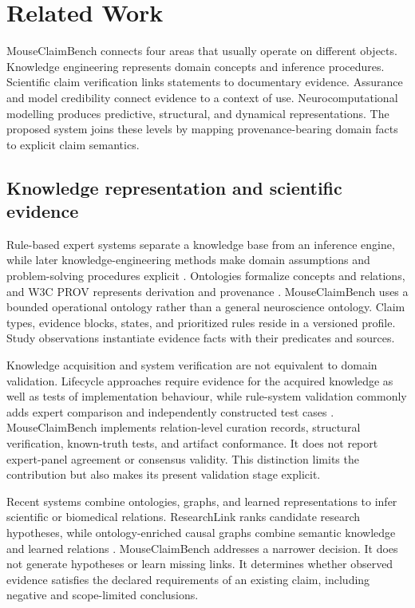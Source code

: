 \section{Related Work}
\label{sec:related-work}

MouseClaimBench connects four areas that usually operate on different objects. Knowledge engineering represents domain concepts and inference procedures. Scientific claim verification links statements to documentary evidence. Assurance and model credibility connect evidence to a context of use. Neurocomputational modelling produces predictive, structural, and dynamical representations. The proposed system joins these levels by mapping provenance-bearing domain facts to explicit claim semantics.

\subsection{Knowledge representation and scientific evidence}
\label{subsec:knowledge-engineering}

Rule-based expert systems separate a knowledge base from an inference engine, while later knowledge-engineering methods make domain assumptions and problem-solving procedures explicit \citep{buchanan1984rulebased,studer1998knowledge}. Ontologies formalize concepts and relations, and W3C PROV represents derivation and provenance \citep{guarino1998formal,lebo2013provo}. MouseClaimBench uses a bounded operational ontology rather than a general neuroscience ontology. Claim types, evidence blocks, states, and prioritized rules reside in a versioned profile. Study observations instantiate evidence facts with their predicates and sources.

Knowledge acquisition and system verification are not equivalent to domain validation. Lifecycle approaches require evidence for the acquired knowledge as well as tests of implementation behaviour, while rule-system validation commonly adds expert comparison and independently constructed test cases \citep{benbasat1989validation,knauf2002validation}. MouseClaimBench implements relation-level curation records, structural verification, known-truth tests, and artifact conformance. It does not report expert-panel agreement or consensus validity. This distinction limits the contribution but also makes its present validation stage explicit.

Recent systems combine ontologies, graphs, and learned representations to infer scientific or biomedical relations. ResearchLink ranks candidate research hypotheses, while ontology-enriched causal graphs combine semantic knowledge and learned relations \citep{borrego2025research,pham2026causal}. MouseClaimBench addresses a narrower decision. It does not generate hypotheses or learn missing links. It determines whether observed evidence satisfies the declared requirements of an existing claim, including negative and scope-limited conclusions.

